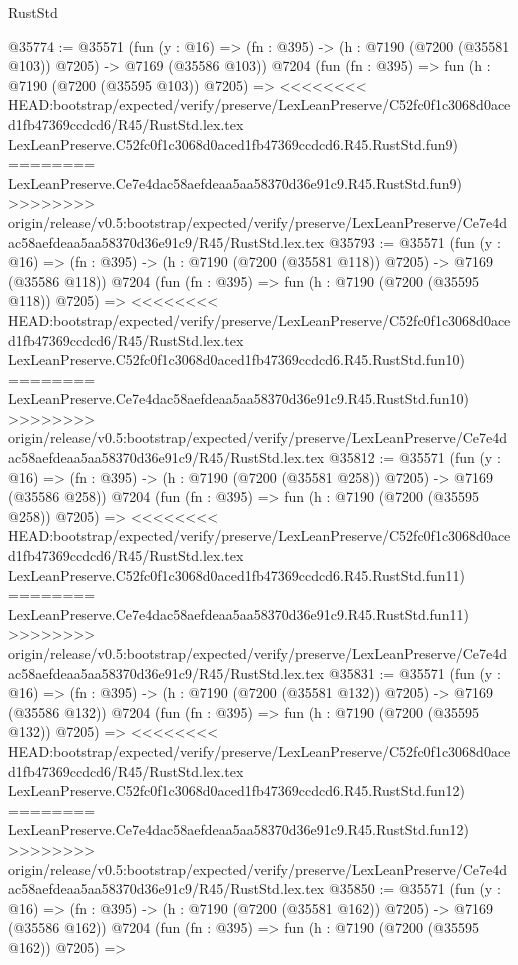 \begin{lexlean}{RustStd}
\begin{coremodule}
{\begin{coremodule}
{{{{{{{{{{{{{{{{{{{{{{{{{{{{{{{{@35774 := @35571
    (fun (y : @16) => (fn : @395) -> (h : @7190 (@7200 (@35581 @103)) @7205) -> @7169 (@35586 @103))
    @7204
    (fun (fn : @395) =>
    fun (h : @7190 (@7200 (@35595 @103)) @7205) =>
<<<<<<<< HEAD:bootstrap/expected/verify/preserve/LexLeanPreserve/C52fc0f1c3068d0aced1fb47369ccdcd6/R45/RustStd.lex.tex
    LexLeanPreserve.C52fc0f1c3068d0aced1fb47369ccdcd6.R45.RustStd.fun9)
========
    LexLeanPreserve.Ce7e4dac58aefdeaa5aa58370d36e91c9.R45.RustStd.fun9)
>>>>>>>> origin/release/v0.5:bootstrap/expected/verify/preserve/LexLeanPreserve/Ce7e4dac58aefdeaa5aa58370d36e91c9/R45/RustStd.lex.tex
@35793 := @35571
    (fun (y : @16) => (fn : @395) -> (h : @7190 (@7200 (@35581 @118)) @7205) -> @7169 (@35586 @118))
    @7204
    (fun (fn : @395) =>
    fun (h : @7190 (@7200 (@35595 @118)) @7205) =>
<<<<<<<< HEAD:bootstrap/expected/verify/preserve/LexLeanPreserve/C52fc0f1c3068d0aced1fb47369ccdcd6/R45/RustStd.lex.tex
    LexLeanPreserve.C52fc0f1c3068d0aced1fb47369ccdcd6.R45.RustStd.fun10)
========
    LexLeanPreserve.Ce7e4dac58aefdeaa5aa58370d36e91c9.R45.RustStd.fun10)
>>>>>>>> origin/release/v0.5:bootstrap/expected/verify/preserve/LexLeanPreserve/Ce7e4dac58aefdeaa5aa58370d36e91c9/R45/RustStd.lex.tex
@35812 := @35571
    (fun (y : @16) => (fn : @395) -> (h : @7190 (@7200 (@35581 @258)) @7205) -> @7169 (@35586 @258))
    @7204
    (fun (fn : @395) =>
    fun (h : @7190 (@7200 (@35595 @258)) @7205) =>
<<<<<<<< HEAD:bootstrap/expected/verify/preserve/LexLeanPreserve/C52fc0f1c3068d0aced1fb47369ccdcd6/R45/RustStd.lex.tex
    LexLeanPreserve.C52fc0f1c3068d0aced1fb47369ccdcd6.R45.RustStd.fun11)
========
    LexLeanPreserve.Ce7e4dac58aefdeaa5aa58370d36e91c9.R45.RustStd.fun11)
>>>>>>>> origin/release/v0.5:bootstrap/expected/verify/preserve/LexLeanPreserve/Ce7e4dac58aefdeaa5aa58370d36e91c9/R45/RustStd.lex.tex
@35831 := @35571
    (fun (y : @16) => (fn : @395) -> (h : @7190 (@7200 (@35581 @132)) @7205) -> @7169 (@35586 @132))
    @7204
    (fun (fn : @395) =>
    fun (h : @7190 (@7200 (@35595 @132)) @7205) =>
<<<<<<<< HEAD:bootstrap/expected/verify/preserve/LexLeanPreserve/C52fc0f1c3068d0aced1fb47369ccdcd6/R45/RustStd.lex.tex
    LexLeanPreserve.C52fc0f1c3068d0aced1fb47369ccdcd6.R45.RustStd.fun12)
========
    LexLeanPreserve.Ce7e4dac58aefdeaa5aa58370d36e91c9.R45.RustStd.fun12)
>>>>>>>> origin/release/v0.5:bootstrap/expected/verify/preserve/LexLeanPreserve/Ce7e4dac58aefdeaa5aa58370d36e91c9/R45/RustStd.lex.tex
@35850 := @35571
    (fun (y : @16) => (fn : @395) -> (h : @7190 (@7200 (@35581 @162)) @7205) -> @7169 (@35586 @162))
    @7204
    (fun (fn : @395) =>
    fun (h : @7190 (@7200 (@35595 @162)) @7205) =>
}}}}}}}}}}}}}}}}}}}}}}}}}}}}}}}}
\end{coremodule}}
\end{coremodule}
\end{lexlean}
